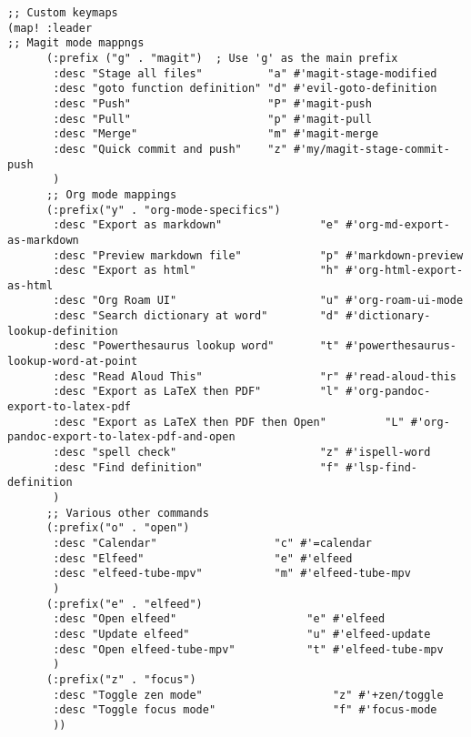 \documentclass[11pt]{article}
\begin{document}
\begin{verbatim}
;; Custom keymaps
(map! :leader
;; Magit mode mappngs
      (:prefix ("g" . "magit")  ; Use 'g' as the main prefix
       :desc "Stage all files"          "a" #'magit-stage-modified
       :desc "goto function definition" "d" #'evil-goto-definition
       :desc "Push"                     "P" #'magit-push
       :desc "Pull"                     "p" #'magit-pull
       :desc "Merge"                    "m" #'magit-merge
       :desc "Quick commit and push"    "z" #'my/magit-stage-commit-push
       )
      ;; Org mode mappings
      (:prefix("y" . "org-mode-specifics")
       :desc "Export as markdown"               "e" #'org-md-export-as-markdown
       :desc "Preview markdown file"            "p" #'markdown-preview
       :desc "Export as html"                   "h" #'org-html-export-as-html
       :desc "Org Roam UI"                      "u" #'org-roam-ui-mode
       :desc "Search dictionary at word"        "d" #'dictionary-lookup-definition
       :desc "Powerthesaurus lookup word"       "t" #'powerthesaurus-lookup-word-at-point
       :desc "Read Aloud This"                  "r" #'read-aloud-this
       :desc "Export as LaTeX then PDF"         "l" #'org-pandoc-export-to-latex-pdf
       :desc "Export as LaTeX then PDF then Open"         "L" #'org-pandoc-export-to-latex-pdf-and-open
       :desc "spell check"                      "z" #'ispell-word
       :desc "Find definition"                  "f" #'lsp-find-definition
       )
      ;; Various other commands
      (:prefix("o" . "open")
       :desc "Calendar"                  "c" #'=calendar
       :desc "Elfeed"                    "e" #'elfeed
       :desc "elfeed-tube-mpv"           "m" #'elfeed-tube-mpv
       )
      (:prefix("e" . "elfeed")
       :desc "Open elfeed"                    "e" #'elfeed
       :desc "Update elfeed"                  "u" #'elfeed-update
       :desc "Open elfeed-tube-mpv"           "t" #'elfeed-tube-mpv
       )
      (:prefix("z" . "focus")
       :desc "Toggle zen mode"                    "z" #'+zen/toggle
       :desc "Toggle focus mode"                  "f" #'focus-mode
       ))
\end{verbatim}
\end{document}
